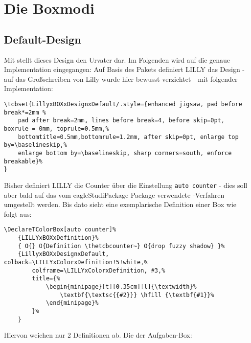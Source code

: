\section{Die Boxmodi}
\subsection{Default-Design}
Mit  stellt dieses Design den Urvater dar. Im Folgenden wird auf die genaue Implementation eingegangen:\newline
Auf Basis des Pakets  definiert LILLY das Design  - auf das Großschreiben von Lilly wurde hier bewusst verzichtet - mit folgender Implementation:
{\begin{lstlisting}[style=latex]
\tcbset{LillyxBOXxDesignxDefault/.style={enhanced jigsaw, pad before break*=2mm %
    pad after break=2mm, lines before break=4, before skip=0pt, boxrule = 0mm, toprule=0.5mm,% 
    bottomtitle=0.5mm,bottomrule=1.2mm, after skip=0pt, enlarge top by=\baselineskip,%
    enlarge bottom by=\baselineskip, sharp corners=south, enforce breakable}%
}
\end{lstlisting}}
Bisher definiert LILLY die Counter über die Einstellung \verb|auto counter| - dies soll aber bald auf das vom eagleStudiPackage Package verwendete -Verfahren umgestellt werden. Bis dato sieht eine exemplarische Definition einer Box wie folgt aus:
{\begin{lstlisting}[style=latex]
\DeclareTColorBox[auto counter]%
    {LILLYxBOXxDefinition}%
    { O{} O{Definition \thetcbcounter~} O{drop fuzzy shadow} }%
    {LillyxBOXxDesignxDefault, colback=\LILLYxColorxDefinition!5!white,%
        colframe=\LILLYxColorxDefinition, #3,%
        title={%
            \begin{minipage}[t][0.35cm][l]{\textwidth}%
                \textbf{\textsc{{#2}}} \hfill {\textbf{#1}}%
            \end{minipage}%
        }%
    }
\end{lstlisting}}
Hiervon weichen nur 2 Definitionen ab. Die der Aufgaben-Box:

